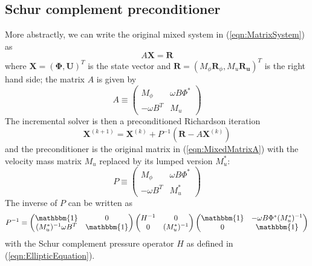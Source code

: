 \documentclass[12pt]{article}
\renewcommand{\vec}[1]{\boldsymbol{#1}}
\begin{document}
\subsection{Schur complement preconditioner}
More abstractly, we can write the original mixed system in (\ref{eqn:MatrixSystem}) as
\begin{equation}
  A\vec{X} = \vec{R}
\end{equation}
where $\vec{X}=(\vec{\Phi},\vec{U})^T$ is the state vector and 
$\vec{R}=(M_{\phi}\vec{R}_{\phi},M_u\vec{R}_{\vec{u}})^T$ is the right hand side; the matrix $A$ is given by
\begin{equation}
  A \equiv
\begin{pmatrix}
  M_\phi & \omega B\Phi^* \\
  -\omega B^T & M_u
\end{pmatrix}
\label{eqn:MixedMatrixA}
\end{equation}
The incremental solver is then a preconditioned Richardson iteration
\begin{equation}
  \vec{X}^{(k+1)} = \vec{X}^{(k)} + P^{-1}\left(\vec{R}-A\vec{X}^{(k)}\right)
\end{equation}
and the preconditioner is the original matrix in (\ref{eqn:MixedMatrixA}) with the velocity mass matrix $M_u$ replaced by its lumped version $M_u^*$:
\begin{equation}
    P \equiv
\begin{pmatrix}
  M_\phi & \omega B\Phi^* \\
  -\omega B^T & M^*_u
\end{pmatrix}
\end{equation}
The inverse of $P$ can be written as
\begin{equation}
    P^{-1} =
\begin{pmatrix}
  \mathbbm{1} & 0 \\
 (M_u^*)^{-1}\omega B^T  & \mathbbm{1}
\end{pmatrix}
\begin{pmatrix}
  H^{-1} & 0 \\
  0 & (M_u^*)^{-1}
\end{pmatrix}
\begin{pmatrix}
  \mathbbm{1} & -\omega B\Phi^* (M_u^*)^{-1} \\
  0 & \mathbbm{1}
\end{pmatrix}
\end{equation}
with the Schur complement pressure operator $H$ as defined in (\ref{eqn:EllipticEquation}).
\end{document}
